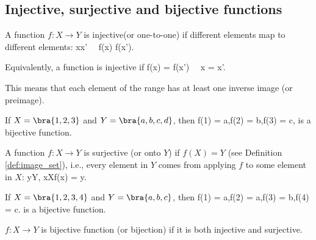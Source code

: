 \subsection{Injective, surjective and bijective functions}

\begin{definition}\label{def:injective_function}
A function $f:X\to Y$ is injective(or one-to-one) if different elements map to different elements:
\be
x\neq x'  \ \ra \ f(x) \neq f(x').
\ee

Equivalently, a function is injective if
\be
f(x) = f(x') \ \ra \ x = x'.
\ee%
\end{definition}

\begin{remark}
This means that each element of the range has at least one inverse image (or preimage).
\end{remark}

\begin{example}\label{exa:injective_function_4}
If $X = \bra{1,2,3}$ and $Y = \bra{a,b,c,d}$, then
\be
f(1) = a,\quad f(2) = b,\quad f(3) = c,
\ee
is a bijective function.
\end{example}

\begin{definition}\label{def:surjective_function}
A function $f:X\to Y$ is surjective (or onto $Y$) if $f(X) = Y$ (see Definition \ref{def:image_set}), i.e., every element in $Y$ comes from applying $f$ to some element in $X$:
\be
{}y\in Y, x\in Xf(x) = y.
\ee%
\end{definition}

\begin{example}\label{exa:surjective_function_4}
If $X = \bra{1,2,3,4}$ and $Y = \bra{a,b,c}$, then
\be
f(1) = a,\quad f(2) = a,\quad f(3) = b,\quad f(4) = c.
\ee
is a bijective function.
\end{example}

\begin{definition}\label{def:bijective_function}
$f:X\to Y$ is bijective function (or bijection) if it is both injective and surjective.
\end{definition}

